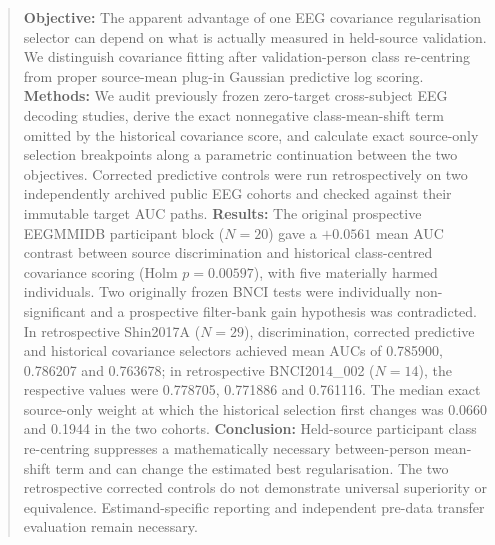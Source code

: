 \begin{abstract}
\textbf{Objective:} The apparent advantage of one EEG covariance
regularisation selector can depend on what is actually measured
in held-source validation. We distinguish covariance fitting
after validation-person class re-centring from proper
source-mean plug-in Gaussian predictive log scoring.
\textbf{Methods:} We audit previously frozen zero-target
cross-subject EEG decoding studies, derive the exact
nonnegative class-mean-shift term omitted by the historical
covariance score, and calculate exact source-only selection
breakpoints along a parametric continuation between
the two objectives. Corrected predictive controls
were run retrospectively on two independently archived
public EEG cohorts and checked against their immutable
target AUC paths.
\textbf{Results:} The original prospective EEGMMIDB
participant block ($N=20$) gave a $+0.0561$ mean
AUC contrast between source discrimination and
historical class-centred covariance scoring
(Holm $p=0.00597$), with five materially harmed
individuals. Two originally frozen BNCI tests were
individually non-significant and a prospective
filter-bank gain hypothesis was contradicted.
In retrospective Shin2017A ($N=29$), discrimination,
corrected predictive and historical covariance
selectors achieved mean AUCs of 0.785900,
0.786207 and 0.763678; in retrospective
BNCI2014\_002 ($N=14$), the respective
values were 0.778705, 0.771886 and 0.761116.
The median exact source-only weight at which
the historical selection first changes was
0.0660 and 0.1944 in the two cohorts.
\textbf{Conclusion:} Held-source participant class
re-centring suppresses a mathematically
necessary between-person mean-shift term and
can change the estimated best regularisation.
The two retrospective corrected controls do not
demonstrate universal superiority or equivalence.
Estimand-specific reporting and independent
pre-data transfer evaluation remain necessary.
\end{abstract}
